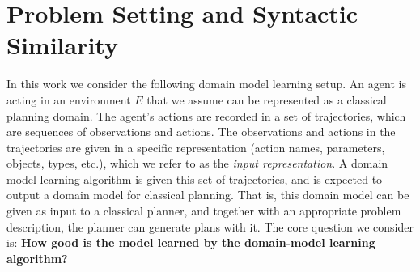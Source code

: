 \documentclass{article}
\theoremstyle{definition}
\theoremstyle{remark}
\newcommand{\realm}{{\ensuremath{M^*}}\xspace}
\newif\ifaddcomments
\newcommand{\roni}[1]{\ifaddcomments{\textcolor{red}{[Roni: #1]}}\fi}
\newcommand{\mauro}[1]{\ifaddcomments{\textcolor{green}{[Mauro: #1]}}\fi}
\newcommand{\gregor}[1]{\ifaddcomments{\textcolor{orange}{[Gregor: #1]}}\fi}
\begin{document}
\roni{To all: do not worry about shortening the background section. I will do this later.}

\section{Problem Setting and Syntactic Similarity}
\label{sec:problem-setting}

\roni{Terminology change: the environment is $E$, the domain reference model is $\realm$} 

In this work we consider the following domain model learning setup. 
An agent is acting in an environment $E$ that we assume can be represented as a classical planning domain. 
The agent's actions are recorded in a set of trajectories, which are sequences of observations and actions. 
The observations and actions in the trajectories are given in a specific representation (action names, parameters, objects, types, etc.), which we refer to as the \emph{input representation}. 
A domain model learning algorithm is given this set of trajectories, and is expected to output a domain model for classical planning. 
That is, this domain model can be given as input to a classical planner, and together with an appropriate problem description, the planner can generate plans with it.
\gregor{Maybe add: These plans then should be applicable in the environment $\realm$ and should lead to the goal set in the problem description.}
The core question we consider is: \textbf{How good is the model learned by the domain-model learning algorithm?}
\end{document}
